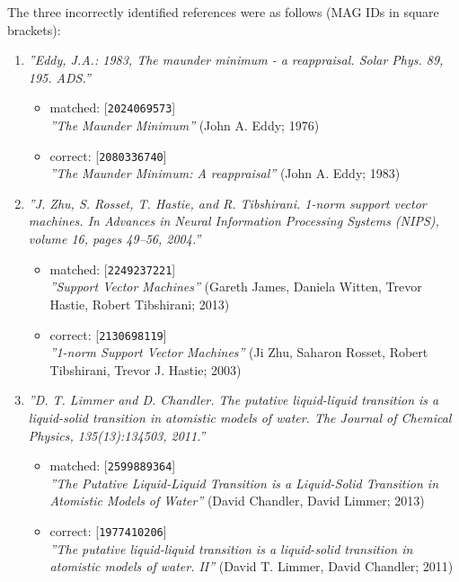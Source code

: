 The three incorrectly identified references were as follows (MAG IDs in square brackets):
\begin{enumerate}
    \item \emph{''Eddy, J.A.: 1983, The maunder minimum - a reappraisal. Solar Phys. 89, 195. ADS.''}
    \begin{itemize}
        \item matched: [\texttt{2024069573}]\\\emph{''The Maunder Minimum''} (John A. Eddy; 1976)
        \item correct: [\texttt{2080336740}]\\\emph{''The Maunder Minimum: A reappraisal''} (John A. Eddy; 1983)
    \end{itemize}
    \item \emph{''J. Zhu, S. Rosset, T. Hastie, and R. Tibshirani. 1-norm support vector machines. In Advances in Neural Information Processing Systems (NIPS), volume 16, pages 49–56, 2004.''}
    \begin{itemize}
        \item matched: [\texttt{2249237221}]\\\emph{''Support Vector Machines''} (Gareth James, Daniela Witten, Trevor Hastie, Robert Tibshirani; 2013)
        \item correct: [\texttt{2130698119}]\\\emph{''1-norm Support Vector Machines''} (Ji Zhu, Saharon Rosset, Robert Tibshirani, Trevor J. Hastie; 2003)
    \end{itemize}
    \item \emph{''D. T. Limmer and D. Chandler. The putative liquid-liquid transition is a liquid-solid transition in atomistic models of water. The Journal of Chemical Physics, 135(13):134503, 2011.''}
    \begin{itemize}
        \item matched: [\texttt{2599889364}]\\\emph{''The Putative Liquid-Liquid Transition is a Liquid-Solid Transition in Atomistic Models of Water''} (David Chandler, David Limmer; 2013)
        \item correct: [\texttt{1977410206}]\\\emph{''The putative liquid-liquid transition is a liquid-solid transition in atomistic models of water. II''} (David T. Limmer, David Chandler; 2011)
    \end{itemize}
\end{enumerate}
